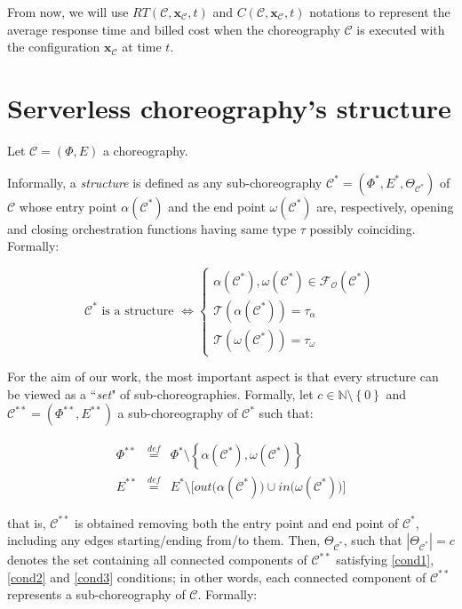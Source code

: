\documentclass[12pt,a4paper]{report}
\newcommand{\mathDef}{\overset{\textit{def}}{=}}
\newcommand{\N}{\mathbb{N}}
\newcommand{\ItalicQuotMark}[1]{``\textit{#1}"}
\begin{document}
From now, we will use $RT(\mathcal{C},\textbf{x}_{\mathcal{C}}, t)$ and $C(\mathcal{C},\textbf{x}_{\mathcal{C}}, t)$ notations to represent the average response time and billed cost when the choreography $\mathcal{C}$ is executed with the configuration $\textbf{x}_{\mathcal{C}}$ at time $t$. 

\section{Serverless choreography's structure}

Let $\mathcal{C} = (\Phi,E)$ a choreography. 

Informally, a \textit{structure} is defined as any sub-choreography $\mathcal{C}^*= (\Phi^*,E^*,\Theta_{\mathcal{C}^*})$ of $\mathcal{C}$ whose entry point $\alpha(\mathcal{C}^*)$ and the end point $\omega(\mathcal{C}^*)$ are, respectively, opening and closing orchestration functions having same type $\tau$ possibly coinciding. Formally:

\begin{equation}
	\mathcal{C}^* \text{ is a structure } \Leftrightarrow \left\{ \begin{array}{l}
		\alpha(\mathcal{C}^*), \omega(\mathcal{C}^*) \in \mathscr{F_O}(\mathcal{C}^*) \\
		
		\mathscr{T}(\alpha(\mathcal{C}^*)) = \tau_{\alpha} \\ \mathscr{T}(\omega(\mathcal{C}^*)) = \tau_{\omega}
	\end{array} \right.
\end{equation}

For the aim of our work, the most important aspect is that every structure can be viewed as a \ItalicQuotMark{set} of sub-choreographies. Formally, let $c \in \N \setminus \left\{0\right\}$ and $\mathcal{C}^{**} = (\Phi^{**},E^{**})$ a sub-choreography of $\mathcal{C}^*$ such that:

\begin{equation}
	\begin{array}{lll}
		\Phi^{**} & \mathDef & \Phi^* \setminus \left\lbrace \alpha(\mathcal{C}^*),\omega(\mathcal{C}^*) \right\rbrace   \\
		E^{**} & \mathDef & E^* \setminus \Big[ out \Big( \alpha(\mathcal{C}^*) \Big) \cup in \Big( \omega(\mathcal{C}^*) \Big) \Big]
	\end{array}
\end{equation}

that is, $\mathcal{C}^{**}$ is obtained removing both the entry point and end point of $\mathcal{C}^{*}$, including any edges starting/ending from/to them. Then, $\Theta_{\mathcal{C}^*}$, such that $|\Theta_{\mathcal{C}^*}| = c$ denotes the set containing all connected components of $\mathcal{C}^{**}$ satisfying \ref{cond1}, \ref{cond2} and \ref{cond3} conditions; in other words, each connected component of $\mathcal{C}^{**}$ represents a sub-choreography of $\mathcal{C}$. Formally:
\end{document}
